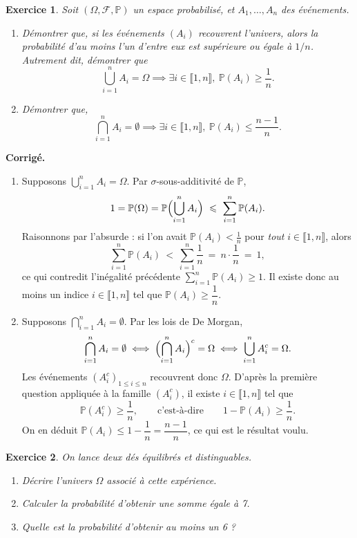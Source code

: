 \documentclass[12pt,a4paper]{article}
\newtheorem{exercice}{Exercice}
\newcommand{\intervalle}[2]{\llbracket #1,#2 \rrbracket}
\renewcommand{\P}{\mathbb{P}}
\renewcommand{\leq}{\leqslant}
\renewcommand{\geq}{\geqslant}
\newenvironment{corrige}{\par\smallskip\noindent\textbf{Corrigé.} }{\par\medskip}
\begin{document}
\begin{exercice}
Soit $(\Omega, \mathcal{F}, \P)$ un espace probabilisé, et $A_1, \dots, A_n$ des
événements.
\begin{enumerate}
    \item Démontrer que, si les événements $(A_i)$ recouvrent l'univers, alors la
probabilité d'au moins l'un d'entre eux est supérieure ou égale à $1/n$. Autrement dit,
démontrer que
\[ \bigcup_{i=1}^{n} A_i = \Omega \implies \exists i \in \intervalle{1}{n},\ \P(A_i) \geq
   \frac{1}{n}. \]
   \item Démontrer que,
\[ \bigcap_{i=1}^{n} A_i = \emptyset \implies \exists i \in \intervalle{1}{n},\ \P(A_i) \leq
   \frac{n - 1}{n}. \]
\end{enumerate}
\end{exercice}

\begin{corrige}
\begin{enumerate}
\item Supposons $\bigcup_{i=1}^n A_i=\Omega$. Par $\sigma$-sous-additivité de $\P$,
\[
1=\P(\Omega)=\P\Bigl(\bigcup_{i=1}^n A_i\Bigr)\ \leq\ \sum_{i=1}^n \P(A_i).
\]
Raisonnons par l'absurde : si l'on avait $\P(A_i)<\frac1n$ pour \emph{tout} $i\in\intervalle{1}{n}$,
alors
\[
\sum_{i=1}^n \P(A_i)\ <\ \sum_{i=1}^n \frac1n\ =\ n\cdot\frac1n\ =\ 1,
\]
ce qui contredit l'inégalité précédente $\sum_{i=1}^n\P(A_i)\geq 1$. Il existe donc au moins
un indice $i\in\intervalle{1}{n}$ tel que $\P(A_i)\geq \dfrac1n$.

\item Supposons $\bigcap_{i=1}^n A_i=\emptyset$. Par les lois de De Morgan,
\[
\bigcap_{i=1}^n A_i=\emptyset \iff \Bigl(\bigcap_{i=1}^n A_i\Bigr)^c=\Omega \iff
\bigcup_{i=1}^n A_i^c=\Omega.
\]
Les événements $(A_i^c)_{1\leq i\leq n}$ recouvrent donc $\Omega$. D'après la première
question appliquée à la famille $(A_i^c)$, il existe $i\in\intervalle{1}{n}$ tel que
\[
\P(A_i^c)\geq \frac1n, \qquad\text{c'est-à-dire}\qquad 1-\P(A_i)\geq \frac1n.
\]
On en déduit $\P(A_i)\leq 1-\dfrac1n=\dfrac{n-1}{n}$, ce qui est le résultat voulu.
\end{enumerate}
\end{corrige}

\begin{exercice}
On lance deux dés équilibrés et distinguables.
\begin{enumerate}
    \item Décrire l'univers $\Omega$ associé à cette expérience.
    \item Calculer la probabilité d'obtenir une somme égale à 7.
    \item Quelle est la probabilité d'obtenir au moins un 6 ?
\end{enumerate}
\end{exercice}
\end{document}
